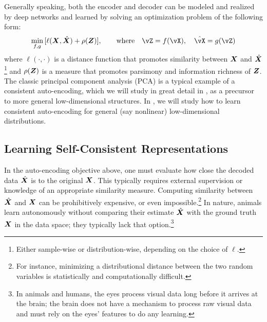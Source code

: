 \documentclass[../../book-main.tex]{subfiles}
\begin{document}
Generally speaking, both the encoder and decoder can be modeled and realized by deep networks and learned by solving an optimization problem of the following form:
\begin{equation}
   \min_{f, g}\, [\ell( \X, \hat \X) + \rho(\Z)], \qquad \text{where} \quad \vZ = f(\vX), \quad \hat \vX = g(\vZ)
   \label{eqn:auto-encoding-objective}
\end{equation}
where $\ell(\cdot, \cdot)$ is a distance function that promotes similarity between $\bm{X}$ and $\hat {\bm{X}}$\footnote{Either sample-wise or distribution-wise, depending on the choice of $\ell$.} and $\rho(\bm{Z})$ is a measure that promotes parsimony and information richness of $\bm{Z}$. The classic principal component analysis (PCA) \cite{JolliffeI2002} is a typical example of a consistent auto-encoding, which we will study in great detail in , as a precursor to more general low-dimensional structures. In , we will study how to learn consistent auto-encoding for general (say nonlinear) low-dimensional distributions.  


\subsection{Learning Self-Consistent Representations}
In the auto-encoding objective above, one must evaluate how close the decoded data $\hat {\bm{X}}$ is to the original $\bm{X}$. This typically requires external supervision or knowledge of an appropriate similarity measure. Computing similarity between $\hat {\bm{X}}$ and $\bm{X}$ can be prohibitively expensive, or even impossible.\footnote{For instance, minimizing a distributional distance between the two random variables is statistically and computationally difficult.} In nature, animals learn autonomously without comparing their estimate $\hat {\bm{X}}$ with the ground truth $\bm{X}$ in the data space; they typically lack that option.\footnote{In animals and humans, the eyes process visual data long before it arrives at the brain; the brain does not have a mechanism to process raw visual data and must rely on the eyes' features to do any learning.}
\end{document}
